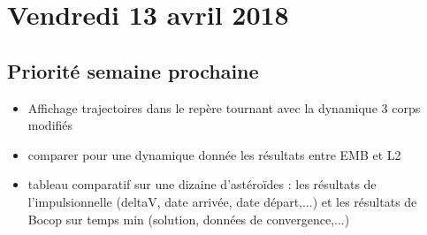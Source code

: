 \documentclass[fleqn,%
a4paper,11pt]{scrbook}
\begin{document}
\newpage
\section*{Vendredi 13 avril 2018}
\subsection*{Priorité semaine prochaine}
\begin{itemize}
	\item Affichage trajectoires dans le repère tournant avec la dynamique 3 corps modifiés
	\item comparer pour une dynamique donnée les résultats entre EMB et L2
	\item tableau comparatif sur une dizaine d'astéroïdes : les résultats de l'impulsionnelle (deltaV, date arrivée, date départ,...)  et les résultats de Bocop  sur temps min (solution, données de convergence,...)
\end{itemize}
\end{document}
